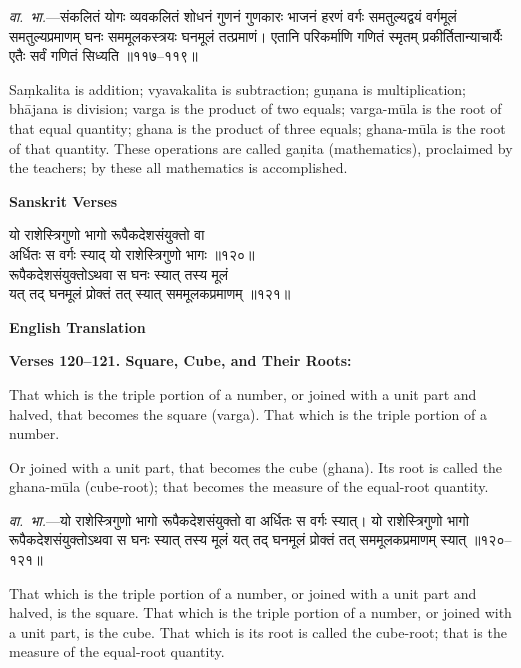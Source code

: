 \documentclass[11pt,a4paper]{article}
\begin{document}
\vspace{0.5em}
\begin{minipage}[t]{0.48\textwidth}
\small\devanagarifont
\textit{वा.~भा.}---संकलितं योगः व्यवकलितं शोधनं गुणनं गुणकारः भाजनं हरणं वर्गः समतुल्यद्वयं वर्गमूलं समतुल्यप्रमाणम् घनः सममूलकस्त्रयः घनमूलं तत्प्रमाणं। एतानि परिकर्माणि गणितं स्मृतम् प्रकीर्तितान्याचार्यैः एतैः सर्वं गणितं सिध्यति ॥११७--११९॥
\end{minipage}%
\hfill
\begin{minipage}[t]{0.48\textwidth}
\small
Sa\d{m}kalita is addition; vyavakalita is subtraction; gu\d{n}ana is multiplication; bh\=ajana is division; varga is the product of two equals; varga-m\=ula is the root of that equal quantity; ghana is the product of three equals; ghana-m\=ula is the root of that quantity. These operations are called ga\d{n}ita (mathematics), proclaimed by the teachers; by these all mathematics is accomplished.
\end{minipage}

\vspace{0.5em}
\begin{minipage}[t]{0.48\textwidth}
\textbf{\small Sanskrit Verses}

\small\devanagarifont
यो राशेस्त्रिगुणो भागो रूपैकदेशसंयुक्तो वा\\
अर्धितः स वर्गः स्याद् यो राशेस्त्रिगुणो भागः ॥१२०॥\\[0.5em]
रूपैकदेशसंयुक्तोऽथवा स घनः स्यात् तस्य मूलं\\
यत् तद् घनमूलं प्रोक्तं तत् स्यात् सममूलकप्रमाणम् ॥१२१॥
\end{minipage}%
\hfill
\begin{minipage}[t]{0.48\textwidth}
\textbf{\small English Translation}

\textbf{Verses 120--121. Square, Cube, and Their Roots:}

That which is the triple portion of a number, or joined with a unit part and halved, that becomes the square (varga). That which is the triple portion of a number.

Or joined with a unit part, that becomes the cube (ghana). Its root is called the ghana-m\=ula (cube-root); that becomes the measure of the equal-root quantity.
\end{minipage}

\vspace{0.5em}
\begin{minipage}[t]{0.48\textwidth}
\small\devanagarifont
\textit{वा.~भा.}---यो राशेस्त्रिगुणो भागो रूपैकदेशसंयुक्तो वा अर्धितः स वर्गः स्यात्। यो राशेस्त्रिगुणो भागो रूपैकदेशसंयुक्तोऽथवा स घनः स्यात् तस्य मूलं यत् तद् घनमूलं प्रोक्तं तत् सममूलकप्रमाणम् स्यात् ॥१२०--१२१॥
\end{minipage}%
\hfill
\begin{minipage}[t]{0.48\textwidth}
\small
That which is the triple portion of a number, or joined with a unit part and halved, is the square. That which is the triple portion of a number, or joined with a unit part, is the cube. That which is its root is called the cube-root; that is the measure of the equal-root quantity.
\end{minipage}
\end{document}
